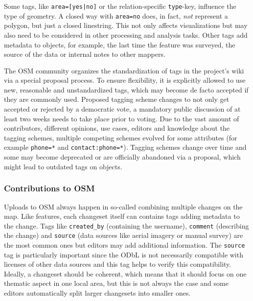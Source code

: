 			Some tags, like \texttt{area=[yes|no]} or the relation-specific \texttt{type}-key, influence the type of geometry.
			A closed way with \texttt{area=no} does, in fact, \textit{not} represent a polygon, but just a closed linestring.
			This not only affects visualizations but may also need to be considered in other processing and analysis tasks.
			Other tags add metadata to objects, for example, the last time the feature was surveyed, the source of the data or internal notes to other mappers.
			
			The OSM community organizes the standardization of tags in the project's wiki via a special proposal process\cite{osm-wiki-proposal-process}.
			To ensure flexibility, it is explicitly allowed to use new, reasonable and unstandardized tags, which may become de facto accepted if they are commonly used.
			Proposed tagging scheme changes to not only get accepted or rejected by a democratic vote, a mandatory public discussion of at least two weeks needs to take place prior to voting.
			Due to the vast amount of contributors, different opinions, use cases, editors and knowledge about the tagging schemes, multiple competing schemes evolved for some attributes (for example \texttt{phone=*} and \texttt{contact:phone=*}).
			Tagging schemes change over time and some may become deprecated or are officially abandoned via a proposal, which might lead to outdated tags on objects.
			
		\subsubsection{Contributions to OSM}
		
			Uploads to OSM always happen in so-called  combining multiple changes on the map\cite{osm-wiki-changeset}.
			Like features, each changeset itself can contains tags adding metadata to the change.
			Tags like \texttt{created\_by} (containing the username), \texttt{comment} (describing the change) and \texttt{source} (data sources like aerial imagery or manual survey) are the most common ones but editors may add additional information.
			The \texttt{source} tag is particularly important since the ODbL is not necessarily compatible with licenses of other data sources and this tag helps to verify this compatibility.
			Ideally, a changeset should be coherent, which means that it should focus on one thematic aspect in one local area, but this is not always the case and some editors automatically split larger changesets into smaller ones. %
			
